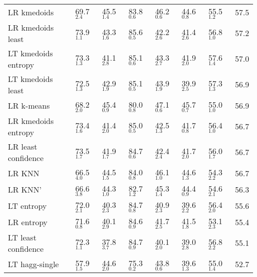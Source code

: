 \begin{tabular}{llllllll}
        LR kmedoids &        69.7$_{2.4}$ &        45.5$_{1.4}$ &        83.8$_{0.6}$ &        46.2$_{0.6}$ &        44.6$_{0.8}$ &        55.5$_{1.2}$ &        57.5 \\
  LR kmedoids least &        73.9$_{1.1}$ &        43.3$_{1.6}$ &        85.6$_{0.5}$ &        42.2$_{2.6}$ &        41.4$_{2.6}$ &        56.8$_{1.0}$ &        57.2 \\
LT kmedoids entropy &        73.3$_{1.3}$ &        41.1$_{2.8}$ &        85.1$_{0.6}$ &        43.3$_{2.7}$ &        41.9$_{2.0}$ &        57.6$_{1.4}$ &        57.0 \\
  LT kmedoids least &        72.5$_{1.3}$ &        42.9$_{1.9}$ &        85.1$_{0.5}$ &        43.9$_{1.9}$ &        39.9$_{2.5}$ &        57.3$_{1.3}$ &        56.9 \\
         LR k-means &        68.2$_{2.0}$ &        45.4$_{0.9}$ &        80.0$_{0.8}$ &        47.1$_{0.6}$ &        45.7$_{0.7}$ &        55.0$_{1.0}$ &        56.9 \\
LR kmedoids entropy &        73.4$_{1.6}$ &        41.4$_{2.0}$ &        85.0$_{0.5}$ &        42.5$_{1.3}$ &        41.7$_{0.8}$ &        56.4$_{1.0}$ &        56.7 \\
LR least confidence &        73.5$_{1.7}$ &        41.9$_{1.7}$ &        84.7$_{0.6}$ &        42.4$_{2.4}$ &        41.7$_{2.0}$ &        56.0$_{1.7}$ &        56.7 \\
             LR KNN &        66.5$_{4.0}$ &        44.5$_{1.5}$ &        84.0$_{0.8}$ &        46.1$_{1.0}$ &        44.6$_{1.3}$ &        54.3$_{2.2}$ &        56.7 \\
            LR KNN' &        66.6$_{3.8}$ &        44.3$_{1.0}$ &        82.7$_{1.2}$ &        45.3$_{1.4}$ &        44.4$_{0.9}$ &        54.6$_{2.1}$ &        56.3 \\
         LT entropy &        72.0$_{2.1}$ &        40.3$_{2.3}$ &        84.7$_{0.8}$ &        40.9$_{2.3}$ &        39.6$_{2.2}$ &        56.4$_{2.0}$ &        55.6 \\
         LR entropy &        71.6$_{0.8}$ &        40.1$_{2.9}$ &        84.6$_{0.9}$ &        41.7$_{2.5}$ &        41.5$_{1.8}$ &        53.1$_{2.3}$ &        55.4 \\
LT least confidence &        72.3$_{1.1}$ &        37.8$_{3.7}$ &        84.7$_{0.9}$ &        40.1$_{2.0}$ &        39.0$_{2.8}$ &        56.8$_{2.2}$ &        55.1 \\
     LT hagg-single &        57.9$_{1.5}$ &        44.6$_{2.0}$ &        75.3$_{0.2}$ &        43.8$_{0.6}$ &        39.6$_{1.3}$ &        55.0$_{1.4}$ &        52.7 \\
\bottomrule
\end{tabular}
